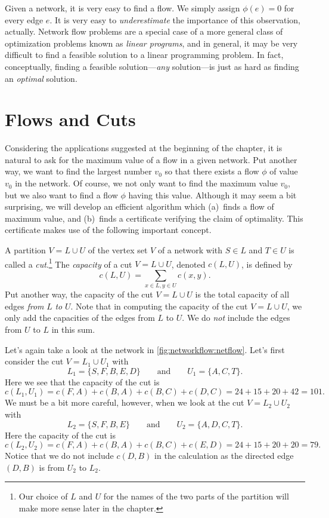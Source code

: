 \begin{remark}
  Given a network, it is very easy to find a flow.  We simply assign
  $\phi(e)=0$ for every edge $e$. It is very easy to
  \textit{underestimate} the importance of this observation,
  actually. Network flow problems are a special case of a more general
  class of optimization problems known as \emph{linear programs}, and
  in general, it may be very difficult to find a feasible solution to
  a linear programming problem.  In fact, conceptually, finding a
  feasible solution---\textit{any} solution---is just as hard as
  finding an \textit{optimal} solution.
\end{remark}

\section{Flows and Cuts}\label{s:networkflow:flows-cuts}

Considering the applications suggested at the beginning of the
chapter, it is natural to ask for the maximum value of a flow in a
given network. Put another way, we want to find the largest number
$v_0$ so that there exists a flow $\phi$ of value $v_0$ in the
network. Of course, we not only want to find the maximum value $v_0$,
but we also want to find a flow $\phi$ having this value.  Although it
may seem a bit surprising, we will develop an efficient algorithm
which (a)~finds a flow of maximum value, and (b)~finds a certificate
verifying the claim of optimality.  This certificate makes use of the
following important concept.

A partition $V=L\cup U$ of the vertex set $V$ of a network 
with $S\in L$ and $T\in U$ is called a
\textit{cut}.\footnote{Our choice of $L$ and $U$ for the names of the
  two parts of the partition will make more sense later in the
  chapter.}  The \textit{capacity} of a cut $V=L\cup U$, denoted
$c(L,U)$, is defined by
\[
c(L,U) = \sum_{x\in L,y\in U} c(x,y).
\]
Put another way, the capacity of the cut $V=L\cup U$ is the total
capacity of all edges \emph{from} $L$ \emph{to} $U$. Note that in
computing the capacity of the cut $V=L\cup U$, we only add the
capacities of the edges from $L$ to $U$.  We do \emph{not} include the
edges from $U$ to $L$ in this sum.

\begin{example}
  Let's again take a look at the network in
  \autoref{fig:networkflow:netflow}. Let's first consider the cut
  $V=L_1\cup U_1$ with
  \[L_1 = \{S,F,B,E,D\}\qquad\text{and}\qquad U_1= \{A,C,T\}.\]
  Here we see that the capacity of the cut is
  \[c(L_1,U_1) = c(F,A) + c(B,A) + c(B,C)+ c(D,C) = 24+15+20+42 =
  101.\]
  We must be a bit more careful, however, when we look at the cut
  $V=L_2\cup U_2$ with
  \[L_2 = \{S,F,B,E\}\qquad\text{and}\qquad U_2=\{A,D,C,T\}.\]
  Here the capacity of the cut is
  \[c(L_2,U_2) = c(F,A) + c(B,A) + c(B,C) + c(E,D) = 24+15+20+20=79.\]
  Notice that we do not include $c(D,B)$ in the calculation as the
  directed edge $(D,B)$ is from $U_2$ to $L_2$.
\end{example}

